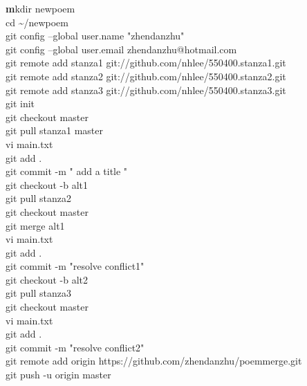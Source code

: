 \documentclass[12pt]{article}
\begin{document}
\noindent\textbf
mkdir newpoem
\\cd  \textasciitilde/newpoem
\\git config --global user.name "zhendanzhu"
\\git config --global user.email zhendanzhu@hotmail.com
\\git remote add stanza1 git://github.com/nhlee/550400.stanza1.git 
\\git remote add stanza2 git://github.com/nhlee/550400.stanza2.git 
\\git remote add stanza3 git://github.com/nhlee/550400.stanza3.git 
\\git init
\\git checkout master
\\git pull stanza1 master
\\vi  main.txt
\\git add .
\\git commit -m " add a title "
\\git checkout -b alt1
\\git pull stanza2
\\git checkout master
\\git merge alt1
\\vi main.txt
\\git add .
\\git commit -m "resolve conflict1"
\\git checkout -b alt2
\\git pull stanza3
\\git checkout master
\\vi main.txt
\\git add .
\\git commit -m "resolve conflict2"
\\git remote add origin https://github.com/zhendanzhu/poemmerge.git
\\git push -u origin master
\end{document}
